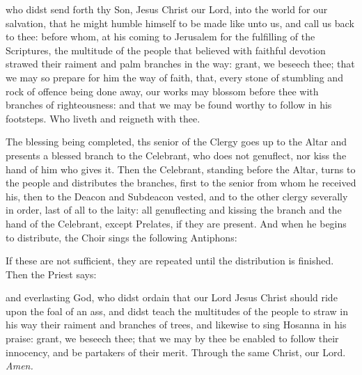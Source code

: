  who didst send forth thy Son, Jesus Christ our Lord, into the world for our salvation, that he might humble himself to be made like unto us, and call us back to thee: before whom, at his coming to Jerusalem for the fulfilling of the Scriptures, the multitude of the people that believed with faithful devotion strawed their raiment and palm branches in the way: grant, we beseech thee; that we may so prepare for him the way of faith, that, every stone of stumbling and rock of offence being done away, our works may blossom before thee with branches of righteousness: and that we may be found worthy to follow in his footsteps. Who liveth and reigneth with thee.
\begin{rubric}
    The blessing being completed, ths senior of the Clergy goes up to the Altar and presents a blessed branch to the Celebrant, who does not genuflect, nor kiss the hand of him who gives it. Then the Celebrant, standing before the Altar, turns to the people and distributes the branches, first to the senior from whom he received his, then to the Deacon and Subdeacon vested, and to the other clergy severally in order, last of all to the laity: all genuflecting and kissing the branch and the hand of the Celebrant, except Prelates, if they are present. And when he begins to distribute, the Choir sings the following Antiphons:
\end{rubric}\par
{}\par
{}
\begin{rubric}
    If these are not sufficient, they are repeated until the distribution is finished. Then the Priest says:
\end{rubric}
{} and everlasting God, who didst ordain that our Lord Jesus Christ should ride upon the foal of an ass, and didst teach the multitudes of the people to straw in his way their raiment and branches of trees, and likewise to sing Hosanna in his praise: grant, we beseech thee; that we may by thee be enabled to follow their innocency, and be partakers of their merit. Through the same Christ, our Lord. \textit{Amen.}
